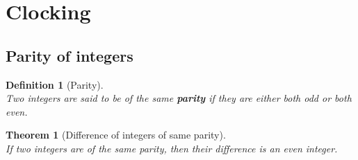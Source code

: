 \documentclass[12pt]{article}
\newtheorem{definition}{Definition}[section]
\newtheorem{theorem}{Theorem}[section]
\theoremstyle{definition}
\begin{document}
\section{Clocking}
\subsection{Parity of integers}
\begin{definition}[Parity]
\hfill\\\normalfont Two integers are said to be of the same \textbf{parity} if they are either both odd or both even.
\end{definition}
\begin{theorem}[Difference of integers of same parity]
\hfill\\\normalfont If two integers are of the same parity, then their difference is an even integer.
\end{theorem}
\end{document}
